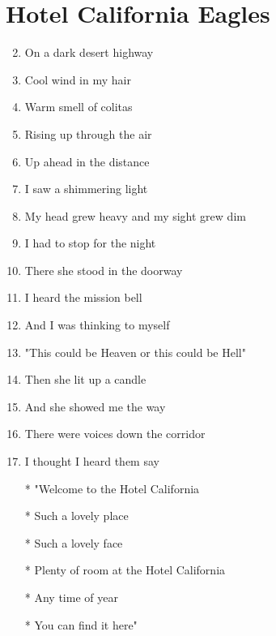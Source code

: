\documentclass{article}
\begin{document}
    \section*{Hotel California \of Eagles}

    \begin{center}
        \begin{enumerate}

            \item[] 
            \item On a dark desert highway
            \item Cool wind in my hair
            \item Warm smell of colitas
            \item Rising up through the air
            \item Up ahead in the distance
            \item I saw a shimmering light
            \item My head grew heavy and my sight grew dim
            \item I had to stop for the night
            \item There she stood in the doorway
            \item I heard the mission bell
            \item And I was thinking to myself
            \item "This could be Heaven or this could be Hell"
            \item Then she lit up a candle
            \item And she showed me the way
            \item There were voices down the corridor
            \item I thought I heard them say
        
            \item[]
            \item[] \chorus
            \item[*] "Welcome to the Hotel California
            \item[*] Such a lovely place
            \item[*] Such a lovely face
            \item[*] Plenty of room at the Hotel California
            \item[*] Any time of year
            \item[*] You can find it here"


\end{enumerate}
\end{center}
\end{document}

